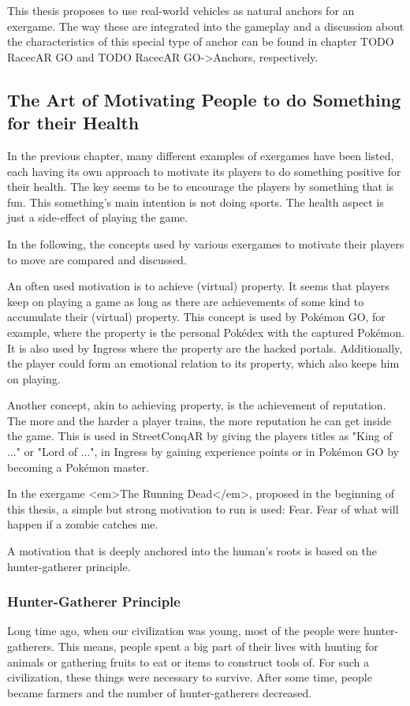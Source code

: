 This thesis proposes to use real-world vehicles as natural anchors for an exergame. The way these are integrated into the gameplay and a discussion about the characteristics of this special type of anchor can be found in chapter TODO RacecAR GO and TODO RacecAR GO->Anchors, respectively.

\subsection{The Art of Motivating People to do Something for their Health}
In the previous chapter, many different examples of exergames have been listed, each having its own approach to motivate its players to do something positive for their health. The key seems to be to encourage the players by something that is fun. This something’s main intention is not doing sports. The health aspect is just a side-effect of playing the game.

In the following, the concepts used by various exergames to motivate their players to move are compared and discussed.

An often used motivation is to achieve (virtual) property. It seems that players keep on playing a game as long as there are achievements of some kind to accumulate their (virtual) property. This concept is used by Pokémon GO, for example, where the property is the personal Pokédex with the captured Pokémon. It is also used by Ingress where the property are the hacked portals. Additionally, the player could form an emotional relation to its property, which also keeps him on playing.

Another concept, akin to achieving property, is the achievement of reputation. The more and the harder a player trains, the more reputation he can get inside the game. This is used in StreetConqAR by giving the players titles as "King of ..." or "Lord of ...", in Ingress by gaining experience points or in Pokémon GO by becoming a Pokémon master.

In the exergame <em>The Running Dead</em>, proposed in the beginning of this thesis, a simple but strong motivation to run is used: Fear. Fear of what will happen if a zombie catches me.

A motivation that is deeply anchored into the human’s roots is based on the hunter-gatherer principle.

\subsubsection{Hunter-Gatherer Principle}
Long time ago, when our civilization was young, most of the people were hunter-gatherers. This means, people spent a big part of their lives with hunting for animals or gathering fruits to eat or items to construct tools of. For such a civilization, these things were necessary to survive. After some time, people became farmers and the number of hunter-gatherers decreased.

